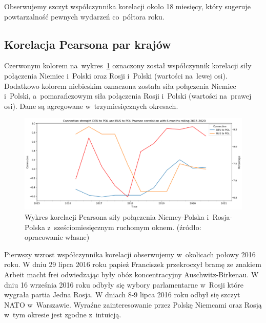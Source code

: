 \documentclass[11pt]{report}
\begin{document}
    Obserwujemy szczyt współczynnika korelacji około 18 miesięcy, który sugeruje powtarzalność pewnych wydarzeń co~półtora roku.

    \subsection{Korelacja Pearsona par krajów}
    Czerwonym kolorem na~wykres~\ref{fig:Connection strength DEU to POL and RUS to POL Pearson correlation with 6 months rolling 2015-2020}
    oznaczony został współczynnik korelacji siły połączenia Niemiec i~Polski oraz Rosji i~Polski (wartości na~lewej osi).
    Dodatkowo kolorem niebieskim oznaczona została siła połączenia Niemiec i~Polski, a~pomarańczowym siła połączenia Rosji i~Polski (wartości na~prawej osi).
    Dane są agregowane w~trzymiesięcznych okresach.

    \begin{figure}[!ht]
        \centering
        \includegraphics[width=\linewidth]{../spade_proto/figures/auto_seek/connection strength/pairwise_rolling_correlation/Connection strength DEU to POL and RUS to POL Pearson correlation with 6 months rolling 2015-2020.png}
        \caption{Wykres korelacji Pearsona siły połączenia Niemcy-Polska i~Rosja-Polska z~sześciomiesięcznym ruchomym oknem. (źródło: opracowanie własne)}
        \label{fig:Connection strength DEU to POL and RUS to POL Pearson correlation with 6 months rolling 2015-2020}
    \end{figure}

    Pierwszy wzrost współczynnika korelacji obserwujemy w~okolicach połowy 2016 roku.
    W dniu 29 lipca 2016 roku papież Franciszek przekroczył bramę ze znakiem Arbeit macht frei odwiedzając
    były obóz koncentracyjny Auschwitz-Birkenau.
    W dniu 16 września 2016 roku odbyły się wybory parlamentarne w~Rosji które wygrała partia Jedna Rosja.
    W dniach 8-9 lipca 2016 roku odbył się szczyt NATO w~Warszawie.
    Wyraźne zainteresowanie przez Polskę Niemcami oraz Rosją w~tym okresie jest zgodne z~intuicją.
\end{document}
